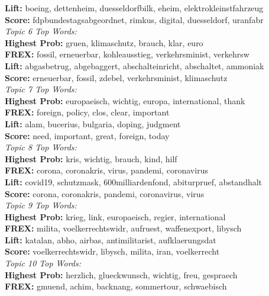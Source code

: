  	 \textbf{Lift:} boeing, dettenheim, duesseldorfbilk, eheim, elektrokleinstfahrzeug \\
 	 \textbf{Score:} fdpbundestagsabgeordnet, rimkus, digital, duesseldorf, uranfabr \\
\textit{Topic 6 Top Words:}\\
 	 \textbf{Highest Prob:} gruen, klimaschutz, brauch, klar, euro \\
 	 \textbf{FREX:} fossil, erneuerbar, kohleausstieg, verkehrsminist, verkehrsw \\
 	 \textbf{Lift:} abgasbetrug, abgebaggert, abschalteinricht, abschaltet, ammoniak \\
 	 \textbf{Score:} erneuerbar, fossil, zdebel, verkehrsminist, klimaschutz \\
\textit{Topic 7 Top Words:}\\
 	 \textbf{Highest Prob:} europaeisch, wichtig, europa, international, thank \\
 	 \textbf{FREX:} foreign, policy, clos, clear, important \\
 	 \textbf{Lift:} alam, bucerius, bulgaria, doping, judgment \\
 	 \textbf{Score:} need, important, great, foreign, today \\
\textit{Topic 8 Top Words:}\\
 	 \textbf{Highest Prob:} kris, wichtig, brauch, kind, hilf \\
 	 \textbf{FREX:} corona, coronakris, virus, pandemi, coronavirus \\
 	 \textbf{Lift:} covid19, schutzmask, 600milliardenfond, abiturpruef, abstandhalt \\
 	 \textbf{Score:} corona, coronakris, pandemi, coronavirus, virus \\
\textit{Topic 9 Top Words:}\\
 	 \textbf{Highest Prob:} krieg, link, europaeisch, regier, international \\
 	 \textbf{FREX:} milita, voelkerrechtswidr, aufruest, waffenexport, libysch \\
 	 \textbf{Lift:} katalan, abho, airbas, antimilitarist, aufklaerungsdat \\
 	 \textbf{Score:} voelkerrechtswidr, libysch, milita, iran, voelkerrecht \\
\textit{Topic 10 Top Words:}\\
 	 \textbf{Highest Prob:} herzlich, glueckwunsch, wichtig, freu, gespraech \\
 	 \textbf{FREX:} gmuend, achim, backnang, sommertour, schwaebisch \\
